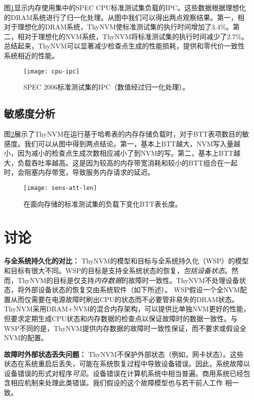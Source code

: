 图\ref{fig:cpu-ipc}显示内存使用集中的SPEC CPU标准测试集负载的IPC。这些数据根据理想化的DRAM系统进行了归一化处理。从图中我们可以得出两点观察结果。第一，相对于理想化的DRAM系统，ThyNVM使标准测试集的执行时间增加了3.4\%。第二，相对于理想化的NVM系统，ThyNVM将标准测试集的执行时间减少了2.7\%。总结起来，ThyNVM可以显著减少检查点生成的性能损耗，提供和零代价一致性系统相近的性能。
 
\begin{figure}[!h]
  \centering
  \texttt{[image: cpu-ipc]}
  \caption{SPEC 2006标准测试集的IPC（数值经过归一化处理）。}
  \label{fig:cpu-ipc}
\end{figure}
 
\subsection{敏感度分析}

图\ref{fig:sens-att-len}展示了ThyNVM在运行基于哈希表的内存存储负载时，对于BTT表项数目的敏感度。我们可以从图中得到两点结论。第一，基本上BTT越大，NVM写入量越小，因为减小的检查点生成次数相应减小了到NVM的写。第二，基本上BTT越大，负载吞吐率越高。这是因为较高的内存带宽消耗和较小的BTT组合在一起时，会阻塞内存带宽，导致服务内存请求的延迟。

\begin{figure}[!h]
  \centering
  \texttt{[image: sens-att-len]}
  \caption{在面向存储的标准测试集的负载下变化BTT表长度。}
  \label{fig:sens-att-len}
\end{figure}

\section{讨论}
\label{sec:thynvm-discuss}

\textbf{与全系统持久化的对比：}
ThyNVM的模型和目标与全系统持久化（WSP）\cite{Narayanan:2012:WP:2150976.2151018}的模型和目标有很大不同。WSP的目标是支持全系统状态的恢复，\emph{包括设备状态}。然而，ThyNVM的目标是仅支持\emph{内存数据}的故障时一致性。ThyNVM不处理设备状态，将外部设备状态的恢复交由系统软件（如下所述）。 WSP假设一个全NVM配置从而仅需要在电源故障时刷出CPU的状态而不必要管非易失的DRAM状态。
ThyNVM采用DRAM+NVM的混合内存架构，可以提供比单独NVM更好的性能\cite{Qureshi:2009:SHP:1555754.1555760, 6378661}，但要求定期生成CPU状态和内存数据的检查点以保证故障时的数据一致性。与WSP不同的是，ThyNVM提供内存数据的故障时一致性保证，而不要求或假设全NVM的配置。

\textbf{故障时外部状态丢失问题：}
ThyNVM不保护外部状态（例如，网卡状态）。这些状态在系统重启后丢失，可能在系统恢复过程中导致设备错误。因此，系统故障以设备错误的形式对程序\emph{可见}。设备错误在计算机系统中相当普遍\cite{Ghemawat:2003:GFS:945445.945450, Ford:2010:AGD:1924943.1924948}。商用系统已经包含相应机制来处理此类错误\cite{cpp:exceptions, Robillard:1999:AEF:318773.319251, Ogasawara:2006:EEO:1111596.1111598}。我们假设的这个故障模型也与若干前人工作
\cite{1003568,1003567,Goodenough:1975:EHI:361227.361230,4222585}相一致。

